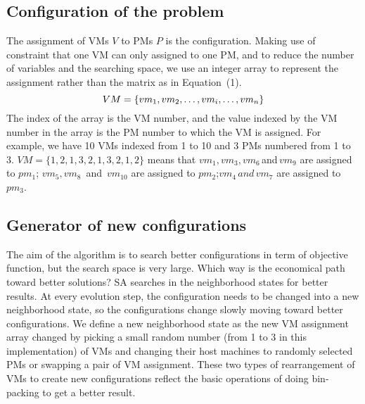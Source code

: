 \documentclass[10pt, conference, compsocconf]{IEEEtran}
\begin{document}
\subsection{Configuration of the problem}
The assignment of VMs $V$ to PMs $P$ is the
configuration. Making use of constraint that one VM can only assigned to one PM,
and to reduce the number of variables and the searching space, we use an integer
array to represent the assignment rather than the matrix as in Equation~(1). 
\begin{equation}\label{10}
VM=\{vm_1,vm_2,\ldots,vm_i,\ldots,vm_{n}\} \\
\end{equation}
The index of the array is the VM number, and the value indexed by the VM number
in the array is the PM number to which the VM is assigned. For example, we have
10 VMs indexed from 1 to 10 and 3 PMs numbered from 1 to 3.
$VM=\{1,2,1,3,2,1,3,2,1,2\}$ means that $vm_1,vm_3,vm_6 \, $and$ \, vm_9$ are
assigned to $pm_1$; $vm_5,vm_8 \,$ and $\, vm_{10}$ are assigned to $pm_2$;$vm_4
\, and \, vm_7$ are assigned to $pm_3$.

\subsection{Generator of new configurations }
The aim of the algorithm is to search better configurations in term of objective
function, but the search space is very large. Which way is the economical path
toward better solutions? SA searches in the neighborhood states for
better results. At every evolution step, the configuration needs to be changed
into a new neighborhood state, so the configurations change slowly moving toward
better configurations. We define a new neighborhood state as the new VM
assignment array changed by picking a small random number (from 1 to 3 in this
implementation) of VMs and changing their host machines to randomly selected PMs
or swapping a pair of VM assignment.
These two types of rearrangement of VMs to create new configurations reflect the
basic operations of doing bin-packing to get a better result.
\end{document}
